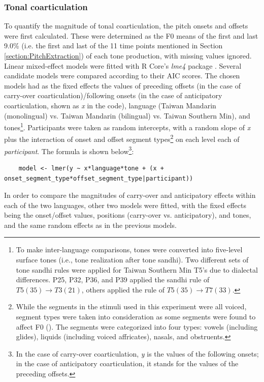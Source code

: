 \subsubsection{Tonal coarticulation}
To quantify the magnitude of tonal coarticulation, the pitch onsets and offsets were first calculated. These were determined as the F0 means of the first and last 9.0\% (i.e. the first and last of the 11 time points mentioned in Section \ref{section:PitchExtraction}) of each tone production, with missing values ignored. Linear mixed-effect models were fitted with R Core’s \citep{RCoreTeam2019} \textit{lme4} package \citep{Batesetal2015}. Several candidate models were compared according to their AIC scores. The chosen models had as the fixed effects the values of preceding offsets (in the case of carry-over coarticulation)/following onsets (in the case of anticipatory coarticulation, shown as \textit{x} in the code), language (Taiwan Mandarin (monolingual) vs. Taiwan Mandarin (bilingual) vs. Taiwan Southern Min), and tones\footnote{To make inter-language comparisons, tones were converted into five-level surface tones (i.e., tone realization after tone sandhi). Two different sets of tone sandhi rules were applied for Taiwan Southern Min T5's due to dialectal differences. P25, P32, P36, and P39 applied the sandhi rule of $T5 (35) \rightarrow T3 (21)$, others applied the rule of $T5 (35) \rightarrow T7 (33)$.}. Participants were taken as random intercepts, with a random slope of \textit{x} plus the interaction of onset and offset segment types\footnote{While the segments in the stimuli used in this experiment were all voiced, segment types were taken into consideration as some segments were found to affect F0 (\citealp{Hanson2009}). The segments were categorized into four types: vowels (including glides), liquids (including voiced affricates), nasals, and obstruents.} on each level each of \textit{participant}. The formula is shown below\footnote{In the case of carry-over coarticulation, \textit{y} is the values of the following onsets; in the case of anticipatory coarticulation, it stands for the values of the preceding offsets.}:

\begin{lstlisting}
    model <- lmer(y ~ x*language*tone + (x + onset_segment_type*offset_segment_type|participant))
\end{lstlisting}

In order to compare the magnitudes of carry-over and anticipatory effects within each of the two languages, other two models were fitted, with the fixed effects being the onset/offset values, positions (carry-over vs. anticipatory), and tones, and the same random effects as in the previous models.

